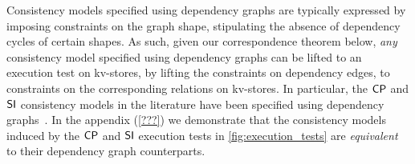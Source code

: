 Consistency models specified using dependency graphs are typically expressed by imposing constraints on the graph shape, \eg stipulating the absence of dependency cycles of certain shapes. 
As such, given our correspondence theorem below, \emph{any} consistency model specified using dependency graphs can be lifted to an execution test on kv-stores, by lifting the constraints on dependency edges, to constraints on the corresponding relations on kv-stores. 
In particular, the $\mathsf{CP}$ and $\mathsf{SI}$ consistency models in the literature have been specified using dependency graphs~\cite{??}. 
In the appendix (\cref{???}) we demonstrate that the consistency models induced by the $\mathsf{CP}$ and $\mathsf{SI}$ execution tests in \cref{fig:execution_tests} are \emph{equivalent} to their dependency graph counterparts. 







